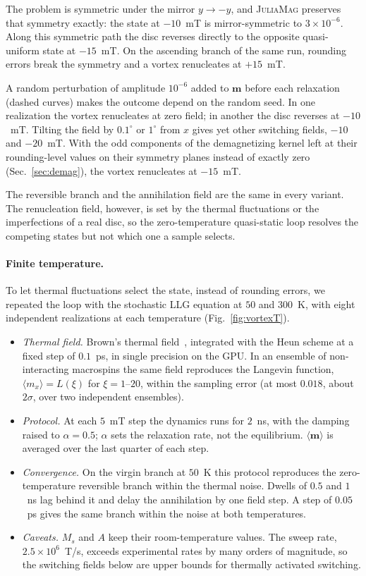 \documentclass{article}      %
\newcommand{\JuliaMag}{\textsc{JuliaMag}}
\newcommand{\vm}{\bm{m}}
\begin{document}
The problem is symmetric under the mirror $y\to-y$, and \JuliaMag{} preserves
that symmetry exactly: the state at $-10$~mT is mirror-symmetric to
$3\times10^{-6}$. Along this symmetric path the disc reverses directly to the
opposite quasi-uniform state at $-15$~mT. On the ascending branch of the same
run, rounding errors break the symmetry and a vortex renucleates at $+15$~mT.

A random perturbation of amplitude $10^{-6}$ added to $\vm$ before each
relaxation (dashed curves) makes the outcome depend on the random seed. In one
realization the vortex renucleates at zero field; in another the disc reverses
at $-10$~mT. Tilting the field by $0.1^\circ$ or $1^\circ$ from $x$ gives yet other
switching fields, $-10$ and $-20$~mT. With the odd components of the demagnetizing kernel
left at their rounding-level values on their symmetry planes instead of exactly zero
(Sec.~\ref{sec:demag}), the vortex renucleates at $-15$~mT.

The reversible branch and the annihilation field are the same in every variant.
The renucleation field, however, is set by the thermal fluctuations or the
imperfections of a real disc, so the zero-temperature quasi-static loop
resolves the competing states but not which one a sample selects.

\paragraph{Finite temperature.}
To let thermal fluctuations select the state, instead of rounding errors, we
repeated the loop with the stochastic LLG equation at $50$ and $300$~K, with eight
independent realizations at each temperature (Fig.~\ref{fig:vortexT}).
\begin{itemize}
  \item \emph{Thermal field.} Brown's thermal field~\cite{brown1963}, integrated
  with the Heun scheme at a fixed step of $0.1$~ps, in single precision on the
  GPU. In an ensemble of non-interacting macrospins the same field reproduces the
  Langevin function, $\langle m_x\rangle=L(\xi)$ for $\xi=1$--$20$, within the
  sampling error (at most $0.018$, about $2\sigma$, over two independent ensembles).
  \item \emph{Protocol.} At each $5$~mT step the dynamics runs for $2$~ns, with
  the damping raised to $\alpha=0.5$; $\alpha$ sets the relaxation rate, not the
  equilibrium. $\langle\vm\rangle$ is averaged over the last quarter of each step.
  \item \emph{Convergence.} On the virgin branch at $50$~K this protocol
  reproduces the zero-temperature reversible branch within the thermal noise.
  Dwells of $0.5$ and $1$~ns lag behind it and delay the annihilation by one field
  step. A step of $0.05$~ps gives the same branch within the noise at both
  temperatures.
  \item \emph{Caveats.} $M_s$ and $A$ keep their room-temperature values. The
  sweep rate, $2.5\times10^{6}$~T/s, exceeds experimental rates by many orders of
  magnitude, so the switching fields below are upper bounds for thermally
  activated switching.
\end{itemize}
\end{document}
